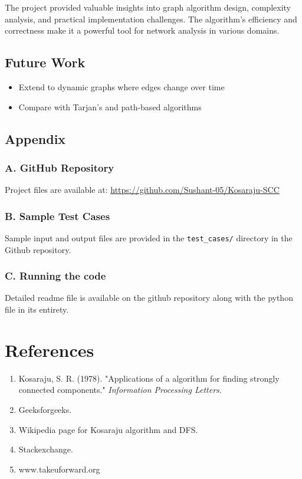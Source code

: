 \documentclass{book}
\theoremstyle{definition}
\begin{document}
The project provided valuable insights into graph algorithm design, complexity analysis, and practical implementation challenges. The algorithm's efficiency and correctness make it a powerful tool for network analysis in various domains.

\section{Future Work}
\begin{itemize}
    \item Extend to dynamic graphs where edges change over time
    \item Compare with Tarjan's and path-based algorithms
\end{itemize}

\section*{Appendix}
\subsection*{A. GitHub Repository}
Project files are available at: \url{https://github.com/Sushant-05/Kosaraju-SCC}
\\
\subsection*{B. Sample Test Cases}
Sample input and output files are provided in the \texttt{test\_cases/} directory in the Github repository.

\subsection*{C. Running the code}
Detailed readme file is available on the github repository along with the python file in its entirety. 

\chapter{References}
\begin{enumerate}
    \item Kosaraju, S. R. (1978). "Applications of a algorithm for finding strongly connected components." \textit{Information Processing Letters}.
    \item Geeksforgeeks.
    \item Wikipedia page for Kosaraju algorithm and DFS.
    \item Stackexchange.
    \item www.takeuforward.org
\end{enumerate}
\end{document}

